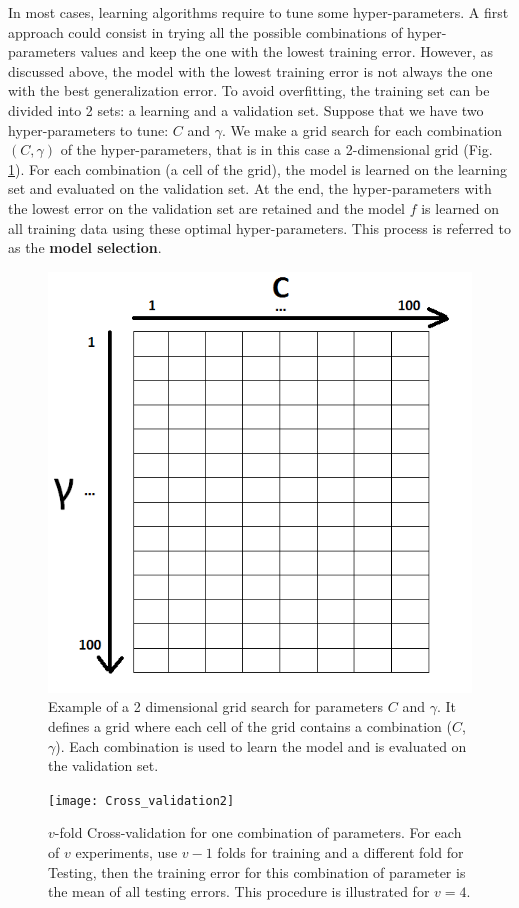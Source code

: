 In most cases, learning algorithms require to tune some hyper-parameters. A first approach could consist in trying all the possible combinations of hyper-parameters values and keep the one with the lowest training error. However, as discussed above, the model with the lowest training error is not always the one with the best generalization error. To avoid overfitting, the training set can be divided into 2 sets: a learning and a validation set. Suppose that we have two hyper-parameters to tune: $C$ and $\gamma$. We make a grid search for each combination $(C,\gamma)$ of the hyper-parameters, that is in this case a 2-dimensional grid (Fig. \ref{fig:GridSearch}). For each combination (a cell of the grid), the model is learned on the learning set and evaluated on the validation set. At the end, the hyper-parameters with the lowest error on the validation set are retained and the model $f$ is learned on all training data using these optimal hyper-parameters. This process is referred to as the \textbf{model selection}. 

\begin{figure}[h!]
	\centering
	\includegraphics[width=0.4\linewidth]{images/GridSearch}
	\caption[Example of a 2 dimensional grid search for parameters $C$ and $\gamma$]{Example of a 2 dimensional grid search for parameters $C$ and $\gamma$. It defines a grid where each cell of the grid contains a combination ($C$, $\gamma$). Each combination is used to learn the model and is evaluated on the validation set.}
	\label{fig:GridSearch}
\end{figure}

\begin{figure}[h!]
	\centering
	\texttt{[image: Cross\_validation2]}
	\caption[$v$-fold Cross-validation for one combination of parameters.]{$v$-fold Cross-validation for one combination of parameters. For each of $v$ experiments, use $v-1$ folds for training and a different fold for Testing, then the training error for this combination of parameter is the mean of all testing errors. This procedure is illustrated for $v=4$.}
	\label{fig:Cross_validation}
\end{figure}

